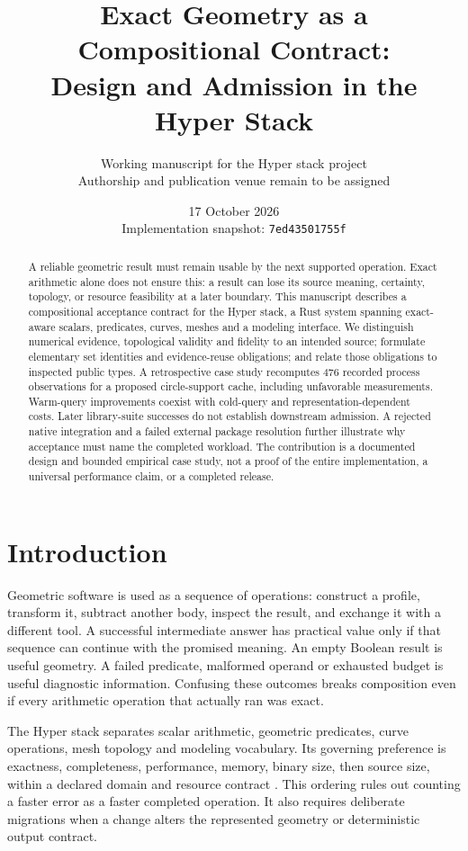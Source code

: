 \documentclass[11pt]{article}
\title{Exact Geometry as a Compositional Contract:\\
Design and Admission in the Hyper Stack}
\author{Working manuscript for the Hyper stack project\\
\small Authorship and publication venue remain to be assigned}
\date{17 October 2026\\\small Implementation snapshot: \texttt{7ed43501755f}}
\begin{document}
\maketitle

\begin{abstract}
A reliable geometric result must remain usable by the next supported operation.
Exact arithmetic alone does not ensure this: a result can lose its source
meaning, certainty, topology, or resource feasibility at a later boundary.
This manuscript describes a compositional acceptance contract for the Hyper
stack, a Rust system spanning exact-aware scalars, predicates, curves, meshes
and a modeling interface. We distinguish numerical evidence, topological
validity and fidelity to an intended source; formulate elementary set identities
and evidence-reuse obligations; and relate those obligations to inspected public
types. A retrospective case study recomputes 476 recorded process observations
for a proposed circle-support cache, including unfavorable measurements.
Warm-query improvements coexist with cold-query and representation-dependent
costs. Later library-suite successes do not establish downstream admission.
A rejected native integration and a failed external package resolution further
illustrate why acceptance must name the completed workload. The contribution is
a documented design and bounded empirical case study, not a proof of the entire
implementation, a universal performance claim, or a completed release.
\end{abstract}

\section{Introduction}
Geometric software is used as a sequence of operations: construct a profile,
transform it, subtract another body, inspect the result, and exchange it with a
different tool. A successful intermediate answer has practical value only if
that sequence can continue with the promised meaning. An empty Boolean result
is useful geometry. A failed predicate, malformed operand or exhausted budget
is useful diagnostic information. Confusing these outcomes breaks composition
even if every arithmetic operation that actually ran was exact.

The Hyper stack separates scalar arithmetic, geometric predicates, curve
operations, mesh topology and modeling vocabulary. Its governing preference is
exactness, completeness, performance, memory, binary size, then source size,
within a declared domain and resource contract \cite{contract}. This ordering
rules out counting a faster error as a faster completed operation. It also
requires deliberate migrations when a change alters the represented geometry
or deterministic output contract.
\end{document}
